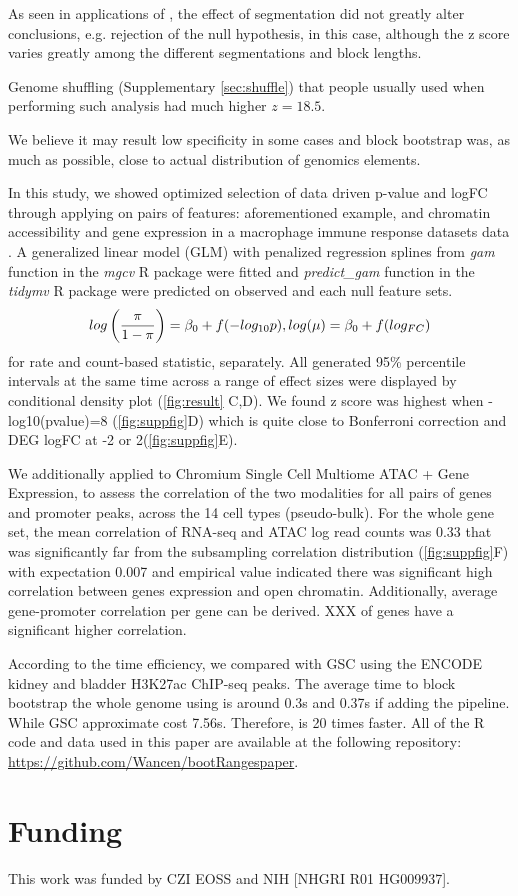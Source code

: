 As seen in applications of \citet{bickel2010subsampling}, the effect
of segmentation did not greatly alter conclusions, e.g. rejection of
the null hypothesis, in this case, although the z score varies greatly
among the different segmentations and block lengths.

Genome shuffling (Supplementary \cref{sec:shuffle}) that people
usually used when performing such analysis had much higher $z = 18.5$.

We believe it may result low specificity in some cases and block
bootstrap was, as much as possible, close to actual distribution of
genomics elements.

In this study, we showed optimized selection of data driven p-value
and logFC through applying \bootranges on pairs of features:
aforementioned example, and chromatin accessibility and gene
expression in a macrophage immune response datasets data
\citep{alasoo2018shared}. A generalized linear model (GLM) with
penalized regression splines from \textit{gam} function in the
\emph{mgcv} R package were fitted and \textit{predict\_gam} function
in the \emph{tidymv} R package were predicted on observed and each
null feature sets.
$$
\setlength{\abovedisplayskip}{3pt}
\setlength{\belowdisplayskip}{3pt}
log \left( \frac{\pi}{1-\pi} \right) = \beta_0  + f (-log_{10}p), log(\mu) = \beta_0 + f (log_{FC})
$$ 
for rate and count-based statistic, separately.  All generated 95\%
percentile intervals at the same time across a range of effect sizes
were displayed by conditional density plot (\cref{fig:result} C,D). We
found z score was highest when -log10(pvalue)=8 (\cref{fig:suppfig}D)
which is quite close to Bonferroni correction and DEG logFC at -2 or
2(\cref{fig:suppfig}E).

We additionally applied \bootranges to Chromium Single Cell Multiome
ATAC + Gene Expression, to assess the correlation of the two
modalities for all pairs of genes and promoter peaks, across the 14
cell types (pseudo-bulk).  For the whole gene set, the mean
correlation of RNA-seq and ATAC log read counts was 0.33 that was
significantly far from the subsampling correlation distribution
(\cref{fig:suppfig}F) with expectation 0.007 and empirical value
indicated there was significant high correlation between genes
expression and open chromatin. Additionally, average gene-promoter
correlation per gene can be derived. XXX of genes have a significant
higher correlation.

According to the time efficiency, we compared with GSC using the
ENCODE kidney and bladder H3K27ac ChIP-seq peaks. The average time to
block bootstrap the whole genome using \bootranges is around 0.3s and
0.37s if adding the \plyranges pipeline. While GSC approximate cost
7.56s. Therefore, \bootranges is 20 times faster.  All of the R code
and data used in this paper are available at the following repository:
\url{https://github.com/Wancen/bootRangespaper}.

\vspace*{-25pt}

\section*{Funding}
This work was funded by CZI EOSS and NIH [NHGRI R01 HG009937]. 
